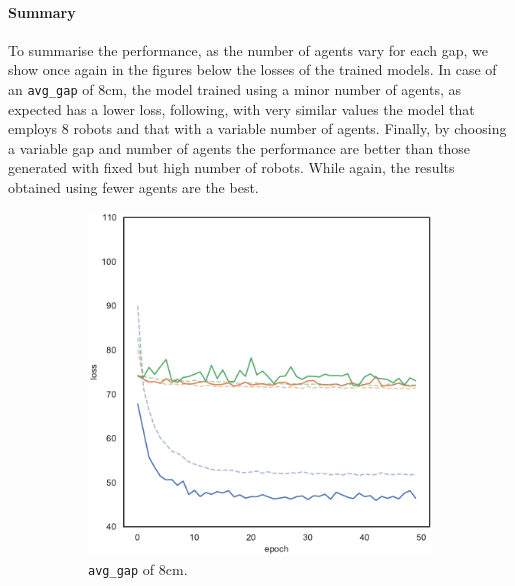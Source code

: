 \paragraph*{Summary}
To summarise the performance, as the number of agents vary for each gap, we 
show once again in the figures below the losses of the trained models.
In case of an \texttt{avg\_gap} of $8$\gls{cm}, the model trained using 
a minor number of agents, as expected has a lower loss, following, with very 
similar values the model that employs 8 robots and that with a variable number of 
agents.
Finally, by choosing a variable gap and number of agents the performance are 
better than those generated with fixed but high number of robots. While again, 
the results obtained using fewer agents are the best.
\begin{figure}[!htb]
	\centering
	\begin{subfigure}[h]{0.3\textwidth}
		\centering
		\includegraphics[width=\textwidth]{contents/images/task1-extension/loss-distributed-gap_8@copy}%
		\caption{\texttt{avg\_gap} of $8$\gls{cm}.}
	\end{subfigure}
	\hfill
	\begin{subfigure}[h]{0.3\textwidth}
		\centering

\end{subfigure}
\end{figure}
